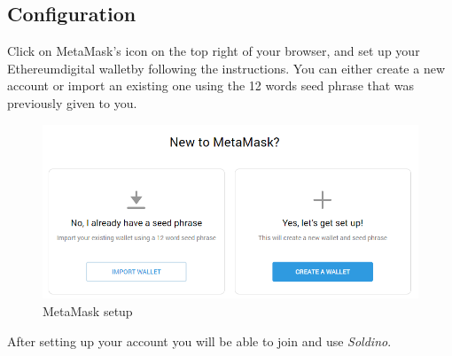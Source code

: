 	\subsection{Configuration}
	Click on MetaMask's icon on the top right of your browser, and set up your 
	Ethereum\glosp digital wallet\glosp by following the instructions. You can either 
	create a new account or import an existing one using the 12 words seed phrase
	that was previously given to you.
	\begin{figure}[H]
		\includegraphics[width=15cm]{res/images/metamask_select.png}
		\centering
		\caption{MetaMask setup}
	\end{figure}
	\noindent After setting up your account you will be able to join and use 
	\textit{Soldino}.

